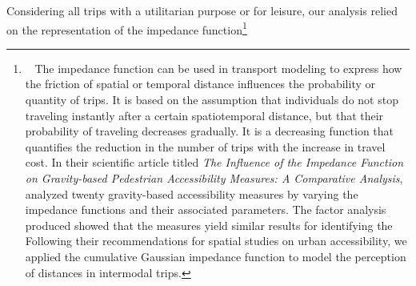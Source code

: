\begin{refsegment}
Considering all trips with a utilitarian purpose or for leisure, our analysis relied on the representation of the impedance function\footnote{~
    The impedance function can be used in transport modeling to express how the friction of spatial or temporal distance influences the probability or quantity of trips. It is based on the assumption that individuals do not stop traveling instantly after a certain spatiotemporal distance, but that their probability of traveling decreases gradually. It is a decreasing function that quantifies the reduction in the number of trips with the increase in travel cost. In their scientific article titled \foreignlanguage{english}{\textsl{The Influence of the Impedance Function on Gravity-based Pedestrian Accessibility Measures: A Comparative Analysis}}, \textcolor{blue}{\textcite[758]{vale_influence_2017}} analyzed twenty gravity-based accessibility measures by varying the impedance functions and their associated parameters. The factor analysis produced showed that the measures yield similar results for identifying the  Following their recommendations for spatial studies on urban accessibility, we applied the cumulative Gaussian impedance function to model the perception of distances in intermodal trips.
}
\end{refsegment}
